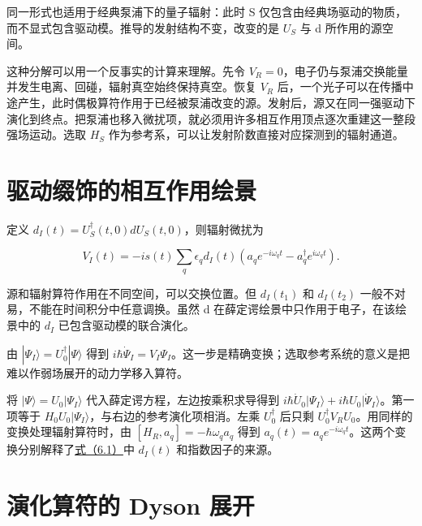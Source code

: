 \documentclass[UTF8,a4paper,zihao=-4,openany,fontset=fandol]{ctexbook}
\begin{document}
同一形式也适用于经典泵浦下的量子辐射：此时 S 仅包含由经典场驱动的物质，而不显式包含驱动模。推导的发射结构不变，改变的是 $U_S$ 与 d 所作用的源空间。



这种分解可以用一个反事实的计算来理解。先令 $V_R=0$，电子仍与泵浦交换能量并发生电离、回碰，辐射真空始终保持真空。恢复 $V_R$ 后，一个光子可以在传播中途产生，此时偶极算符作用于已经被泵浦改变的源。发射后，源又在同一强驱动下演化到终点。把泵浦也移入微扰项，就必须用许多相互作用顶点逐次重建这一整段强场运动。选取 $H_S$ 作为参考系，可以让发射阶数直接对应探测到的辐射通道。



\section{驱动缀饰的相互作用绘景}\label{sec:06:3}


定义 $d_I(t)=U_S^\dagger(t,0)dU_S(t,0)$，则辐射微扰为



\begin{equation*}
V_I(t)=-is(t)\sum_q\epsilon_qd_I(t)
\left(a_qe^{-i\omega_qt}-a_q^\dagger e^{i\omega_qt}\right).
\tag{6.1}\label{eq:6.1}
\end{equation*}


源和辐射算符作用在不同空间，可以交换位置。但 $d_I(t_1)$ 和 $d_I(t_2)$ 一般不对易，不能在时间积分中任意调换。虽然 d 在薛定谔绘景中只作用于电子，在该绘景中的 $d_I$ 已包含驱动模的联合演化。



由 $|\Psi_I\rangle=U_0^\dagger|\Psi\rangle$ 得到 $i\hbar\dot\Psi_I=V_I\Psi_I$。这一步是精确变换；选取参考系统的意义是把难以作弱场展开的动力学移入算符。



将 $\lvert\Psi\rangle=U_0\lvert\Psi_I\rangle$ 代入薛定谔方程，左边按乘积求导得到 $i\hbar\dot U_0\lvert\Psi_I\rangle+i\hbar U_0\lvert\dot\Psi_I\rangle$。第一项等于 $H_0U_0\lvert\Psi_I\rangle$，与右边的参考演化项相消。左乘 $U_0^\dagger$ 后只剩 $U_0^\dagger V_R U_0$。用同样的变换处理辐射算符时，由 $[H_R,a_q]=-\hbar\omega_q a_q$ 得到 $a_q(t)=a_qe^{-i\omega_qt}$。这两个变换分别解释了\hyperref[eq:6.1]{式（6.1）}中 $d_I(t)$ 和指数因子的来源。



\section{演化算符的 Dyson 展开}\label{sec:06:4}
\end{document}
